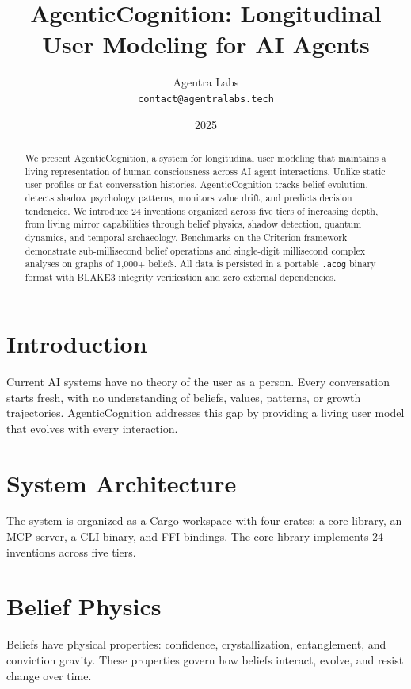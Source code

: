 \documentclass[11pt,a4paper]{article}
\title{AgenticCognition: Longitudinal User Modeling for AI Agents}
\author{%
  Agentra Labs\\
  \texttt{contact@agentralabs.tech}
}
\date{2025}
\begin{document}
\maketitle

\begin{abstract}
We present AgenticCognition, a system for longitudinal user modeling that
maintains a living representation of human consciousness across AI agent
interactions. Unlike static user profiles or flat conversation histories,
AgenticCognition tracks belief evolution, detects shadow psychology patterns,
monitors value drift, and predicts decision tendencies. We introduce 24
inventions organized across five tiers of increasing depth, from living mirror
capabilities through belief physics, shadow detection, quantum dynamics, and
temporal archaeology. Benchmarks on the Criterion framework demonstrate
sub-millisecond belief operations and single-digit millisecond complex analyses
on graphs of 1,000+ beliefs. All data is persisted in a portable \texttt{.acog}
binary format with BLAKE3 integrity verification and zero external dependencies.
\end{abstract}

\section{Introduction}

Current AI systems have no theory of the user as a person. Every conversation
starts fresh, with no understanding of beliefs, values, patterns, or growth
trajectories. AgenticCognition addresses this gap by providing a living user
model that evolves with every interaction.

\section{System Architecture}

The system is organized as a Cargo workspace with four crates: a core library,
an MCP server, a CLI binary, and FFI bindings. The core library implements 24
inventions across five tiers.

\section{Belief Physics}

Beliefs have physical properties: confidence, crystallization, entanglement,
and conviction gravity. These properties govern how beliefs interact, evolve,
and resist change over time.
\end{document}
